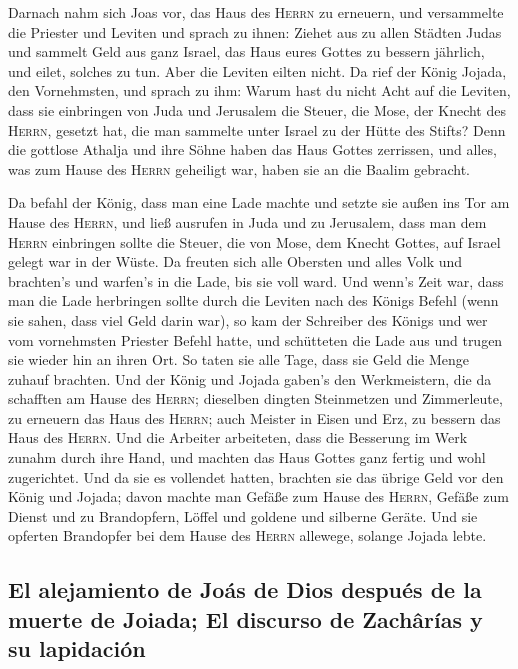  Darnach nahm sich Joas vor, das Haus des \textsc{Herrn}
zu erneuern,  und versammelte die Priester und Leviten und
sprach zu ihnen: Ziehet aus zu allen Städten Judas und sammelt Geld aus
ganz Israel, das Haus eures Gottes zu bessern jährlich, und eilet,
solches zu tun. Aber die Leviten eilten nicht.  Da rief
der König Jojada, den Vornehmsten, und sprach zu ihm: Warum hast du
nicht Acht auf die Leviten, dass sie einbringen von Juda und Jerusalem
die Steuer, die Mose, der Knecht des \textsc{Herrn}, gesetzt hat, die
man sammelte unter Israel zu der Hütte des Stifts?  Denn
die gottlose Athalja und ihre Söhne haben das Haus Gottes zerrissen, und
alles, was zum Hause des \textsc{Herrn} geheiligt war, haben sie an die
Baalim gebracht.

 Da befahl der König, dass man eine Lade machte und setzte
sie außen ins Tor am Hause des \textsc{Herrn},  und ließ
ausrufen in Juda und zu Jerusalem, dass man dem \textsc{Herrn}
einbringen sollte die Steuer, die von Mose, dem Knecht Gottes, auf
Israel gelegt war in der Wüste.  Da freuten sich alle
Obersten und alles Volk und brachten's und warfen's in die Lade, bis sie
voll ward.  Und wenn's Zeit war, dass man die Lade
herbringen sollte durch die Leviten nach des Königs Befehl (wenn sie
sahen, dass viel Geld darin war), so kam der Schreiber des Königs und
wer vom vornehmsten Priester Befehl hatte, und schütteten die Lade aus
und trugen sie wieder hin an ihren Ort. So taten sie alle Tage, dass sie
Geld die Menge zuhauf brachten.  Und der König und Jojada
gaben's den Werkmeistern, die da schafften am Hause des \textsc{Herrn};
dieselben dingten Steinmetzen und Zimmerleute, zu erneuern das Haus des
\textsc{Herrn}; auch Meister in Eisen und Erz, zu bessern das Haus des
\textsc{Herrn}.  Und die Arbeiter arbeiteten, dass die
Besserung im Werk zunahm durch ihre Hand, und machten das Haus Gottes
ganz fertig und wohl zugerichtet.  Und da sie es
vollendet hatten, brachten sie das übrige Geld vor den König und Jojada;
davon machte man Gefäße zum Hause des \textsc{Herrn}, Gefäße zum Dienst
und zu Brandopfern, Löffel und goldene und silberne Geräte. Und sie
opferten Brandopfer bei dem Hause des \textsc{Herrn} allewege, solange
Jojada lebte.

\hypertarget{el-alejamiento-de-jouxe1s-de-dios-despuuxe9s-de-la-muerte-de-joiada-el-discurso-de-zachuxe2ruxedas-y-su-lapidaciuxf3n}{%
\subsection{El alejamiento de Joás de Dios después de la muerte de
Joiada; El discurso de Zachârías y su
lapidación}\label{el-alejamiento-de-jouxe1s-de-dios-despuuxe9s-de-la-muerte-de-joiada-el-discurso-de-zachuxe2ruxedas-y-su-lapidaciuxf3n}}

